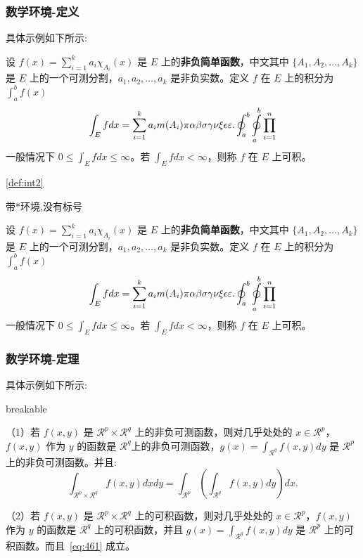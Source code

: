 \subsubsection{数学环境-定义}
具体示例如下所示:
\begin{tcblisting}{}
\begin{definition}[可积性] \label{def:int2} 
设 $ f(x)=\sum\limits_{i=1}^{k} a_i \chi_{A_i}(x)$ 是 $E$ 上的\textbf{非负简单函数}，中文其中 $\{A_1,A_2,\ldots,A_k\}$ 是 $E$ 上的一个可测分割，$a_1,a_2,\ldots,a_k$ 是非负实数。定义 $f$ 在 $E$ 上的积分为 $\int_{a}^b f(x)$
\begin{equation}\label{inter}
\int_{E} f dx = \sum_{i=1}^k a_i m(A_i) \pi \alpha\beta\sigma\gamma\nu\xi\epsilon\varepsilon. \oint_{a}^b\ointop_{a}^b\prod_{i=1}^n
\end{equation}
一般情况下 $0 \leq \int_{E} f dx \leq \infty$。若 $\int_{E} f dx < \infty$，则称 $f$ 在 $E$ 上可积。
\end{definition}
\end{tcblisting}
\ref{def:int2}

带*环境,没有标号
\begin{definition*}[可积性] \label{def:int} 
    设 $ f(x)=\sum\limits_{i=1}^{k} a_i \chi_{A_i}(x)$ 是 $E$ 上的\textbf{非负简单函数}，中文其中 $\{A_1,A_2,\ldots,A_k\}$ 是 $E$ 上的一个可测分割，$a_1,a_2,\ldots,a_k$ 是非负实数。定义 $f$ 在 $E$ 上的积分为 $\int_{a}^b f(x)$
    \begin{equation}\label{inter}
        \int_{E} f dx = \sum_{i=1}^k a_i m(A_i) \pi \alpha\beta\sigma\gamma\nu\xi\epsilon\varepsilon. \oint_{a}^b\ointop_{a}^b\prod_{i=1}^n
    \end{equation}
    一般情况下 $0 \leq \int_{E} f dx \leq \infty$。若 $\int_{E} f dx < \infty$，则称 $f$ 在 $E$ 上可积。
\end{definition*}

\subsubsection{数学环境-定理}
具体示例如下所示:
\begin{tcblisting}{breakable}
\begin{theorem}[Fubini 定理] \label{thm:fubi} 
    （1）若 $f(x,y)$ 是 $\mathcal{R}^p\times\mathcal{R}^q$ 上的非负可测函数，则对几乎处处的 $x\in \mathcal{R}^p$，$f(x,y)$ 作为 $y$ 的函数是 $\mathcal{R}^q$上的非负可测函数，$g(x)=\int_{\mathcal{R}^q}f(x,y) dy$ 是 $\mathcal{R}^p$ 上的非负可测函数。并且:
    \begin{equation}
        \label{eq:461}
        \int_{\mathcal{R}^p\times\mathcal{R}^q} f(x,y) dxdy=\int_{\mathcal{R}^p}\left(\int_{\mathcal{R}^q}f(x,y)dy\right)dx.
    \end{equation}
    
    （2）若 $f(x,y)$ 是 $\mathcal{R}^p\times\mathcal{R}^q$ 上的可积函数，则对几乎处处的 $x\in\mathcal{R}^p$，$f(x,y)$ 作为 $y$ 的函数是 $\mathcal{R}^q$ 上的可积函数，并且 $g(x)=\int_{\mathcal{R}^q}f(x,y) dy$ 是 $\mathcal{R}^p$ 上的可积函数。而且~\ref{eq:461} 成立。
\end{theorem}
\end{tcblisting}

